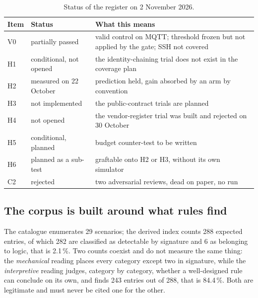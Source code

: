 \begin{table}[H]
\centering
\caption{Status of the register on 2 November 2026.}
\label{tab:registre}
\small
\begin{tabular}{@{}p{1.1cm}p{3.4cm}p{8.2cm}@{}}
\toprule
Item & Status & What this means \\
\midrule
V0 & partially passed & valid control on MQTT; threshold frozen but not applied by the gate; SSH not covered \\
H1 & conditional, not opened & the identity-chaining trial does not exist in the coverage plan \\
H2 & measured on 22 October & prediction held, gain absorbed by an arm by convention \\
H3 & not implemented & the public-contract trials are planned \\
H4 & not opened & the vendor-register trial was built and rejected on 30 October \\
H5 & conditional, planned & budget counter-test to be written \\
H6 & planned as a sub-test & graftable onto H2 or H3, without its own simulator \\
C2 & rejected & two adversarial reviews, dead on paper, no run \\
\bottomrule
\end{tabular}
\end{table}

\subsection{The corpus is built around what rules find}

The catalogue enumerates 29 scenarios; the derived index counts 288 expected
entries, of which 282 are classified as detectable by signature and 6 as belonging
to logic, that is 2.1\,\%. Two counts coexist and do not measure the same thing: the
\emph{mechanical} reading places every category except two in signature, while the
\emph{interpretive} reading judges, category by category, whether a well-designed
rule can conclude on its own, and finds 243 entries out of 288, that is 84.4\,\%.
Both are legitimate and must never be cited one for the other.

